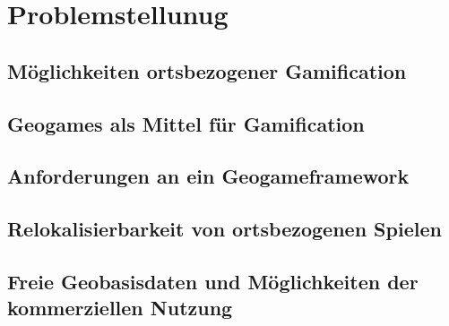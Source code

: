 \section{Problemstellunug}
\label{sec:S2_Problemstellunug}

\subsection{Möglichkeiten ortsbezogener Gamification}

\subsection{Geogames als Mittel für Gamification}

\subsection{Anforderungen an ein Geogameframework}

\subsection{Relokalisierbarkeit von ortsbezogenen Spielen}

\subsection{Freie Geobasisdaten und Möglichkeiten der kommerziellen Nutzung}
